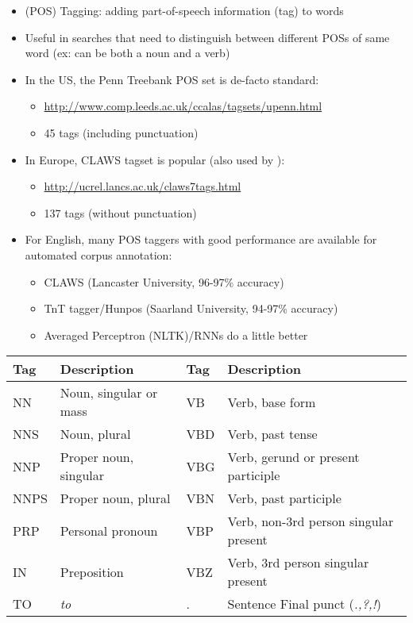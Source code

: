 \documentclass[a4paper,landscape,headrule,footrule,xetex]{foils}
\begin{document}

\begin{itemize}
\item  (POS) Tagging: adding part-of-speech information (tag) to words
\item  Useful in searches that need to distinguish between different POSs of same word
(ex:  can be both a noun and a verb)
\item  In the US, the Penn Treebank POS set is de-facto standard:
  \begin{itemize}
  \item  \url{http://www.comp.leeds.ac.uk/ccalas/tagsets/upenn.html}
  \item 45 tags (including punctuation)
  \end{itemize}
\item  In Europe, CLAWS tagset is popular (also used by \engcor):
  \begin{itemize}
  \item   \url{http://ucrel.lancs.ac.uk/claws7tags.html}
  \item 137 tags (without punctuation)
  \end{itemize}
\item  For English, many POS taggers with good performance are available for
  automated corpus annotation:
  \begin{itemize}
  \item  CLAWS (Lancaster University, 96-97\% accuracy)%
  \item  TnT tagger/Hunpos (Saarland University, 94-97\% accuracy)
  \item  Averaged Perceptron (NLTK)/RNNs do a little better
  \end{itemize}
\end{itemize}



\noindent\begin{tabular}{llll}
  Tag & Description  &   Tag & Description \\
\hline
NN   & Noun, singular or mass  & VB   & Verb, base form    \\                   
NNS  & Noun, plural            & VBD  & Verb, past tense    \\                  
NNP  & Proper noun, singular   & VBG  & Verb, gerund or present participle  \\  
NNPS & Proper noun, plural     & VBN  & Verb, past participle               \\  
PRP  & Personal pronoun        & VBP  & Verb, non-3rd person singular present \\
IN   & Preposition             & VBZ  & Verb, 3rd person singular present     \\
TO   & \textit{to}             & .    & Sentence Final punct (\textit{.,?,!})
\end{tabular}
\end{document}
